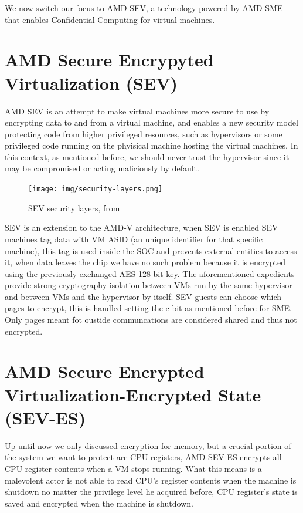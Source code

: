 \documentclass[twocolumn]{article}
\begin{document}
    We now switch our focus to AMD SEV, a technology powered by AMD SME that enables Confidential Computing for virtual machines.

\section{AMD Secure Encrypyted Virtualization (SEV)}

    AMD SEV is an attempt to make virtual machines more secure to use by encrypting data to and from a virtual machine, and enables a new security model protecting code from higher privileged resources, such as hypervisors or some privileged code running on the phyisical machine hosting the virtual machines. In this context, as mentioned before, we should never trust the hypervisor since it may be compromised or acting maliciously by default.

    \begin{figure}
        \centering
        \texttt{[image: img/security-layers.png]}
        \caption{SEV security layers, from \cite{memory-encryption}}
    \end{figure}

    SEV is an extension to the AMD-V architecture, when SEV is enabled SEV machines tag data with VM ASID (an unique identifier for that specific machine), this tag is used inside the SOC and prevents external entities to access it, when data leaves the chip we have no such problem because it is encrypted using the previously exchanged AES-128 bit key. The aforementioned expedients provide strong cryptography isolation between VMs run by the same hypervisor and between VMs and the hypervisor by itself. SEV guests can choose which pages to encrypt, this is handled setting the c-bit as mentioned before for SME. Only pages meant fot oustide communcations are considered shared and thus not encrypted.

\section{AMD Secure Encrypted Virtualization-Encrypted State (SEV-ES)}

    Up until now we only discussed encryption for memory, but a crucial portion of the system we want to protect are CPU registers, AMD SEV-ES encrypts all CPU register contents when a VM stops running. What this means is a malevolent actor is not able to read CPU's register contents when the machine is shutdown no matter the privilege level he acquired before, CPU register's state is saved and encrypted when the machine is shutdown.
\end{document}
